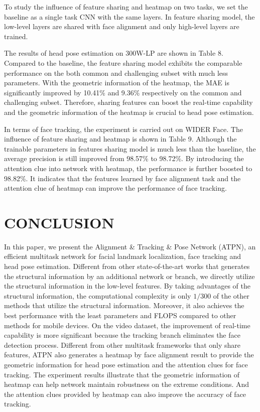 \documentclass[3p,twocolumn, round, sort & compress]{elsarticle}
\begin{document}
To study the influence of feature sharing and heatmap on two tasks, we set the baseline as a single task CNN with the same layers. In feature sharing model, the low-level layers are shared with face alignment and only high-level layers are trained.

The results of head pose estimation on 300W-LP are shown in Table 8. Compared to the baseline, the feature sharing model exhibits the comparable performance on the both common and challenging subset with much less parameters. With the geometric information of the heatmap, the MAE is significantly improved by 10.41\% and 9.36\% respectively on the common and challenging subset. Therefore, sharing features can boost the real-time capability and the geometric information of the heatmap is crucial to head pose estimation.

In terms of face tracking, the experiment is carried out on WIDER Face. The influence of feature sharing and heatmap is shown in Table 9. Although the trainable parameters in features sharing model is much less than the baseline, the average precision is still improved from 98.57\% to 98.72\%. By introducing the attention clue into network with heatmap, the performance is further boosted to 98.82\%. It indicates that the features learned by face alignment task and the attention clue of heatmap can improve the performance of face tracking.









\section{CONCLUSION}
In this paper, we present the Alignment \& Tracking \& Pose Network (ATPN), an efficient multitask network for facial landmark localization, face tracking and head pose estimation. Different from other state-of-the-art works that generates the structural information by an additional network or branch, we directly utilize the structural information in the low-level features. By taking advantages of the structural information, the computational complexity is only $1/300$ of the other methods that utilize the structural information. Moreover, it also achieves the best performance with the least parameters and FLOPS compared to other methods for mobile devices. On the video dataset, the improvement of real-time capability is more significant because the tracking branch eliminates the face detection process. Different from other multitask frameworks that only share features, ATPN also generates a heatmap by face alignment result to provide the geometric information for head pose estimation and the attention clues for face tracking. The experiment results illustrate that the geometric information of heatmap can help network maintain robustness on the extreme conditions. And the attention clues provided by heatmap can also improve the accuracy of face tracking.
\end{document}
